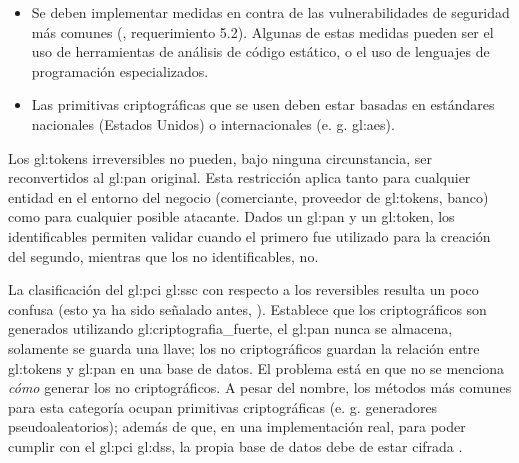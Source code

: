 \begin{itemize}
  \item Se deben implementar medidas en contra de las vulnerabilidades de
    seguridad más comunes (\cite{dss_pa}, requerimiento 5.2). Algunas de estas
    medidas pueden ser el uso de herramientas de análisis de código estático,
    o el uso de lenguajes de programación especializados.

  \item Las primitivas criptográficas que se usen deben estar basadas en
    estándares nacionales (Estados Unidos) o internacionales (e. g.
    \gls{gl:aes}).
\end{itemize}

Los \glspl{gl:token} irreversibles no pueden, bajo ninguna circunstancia, ser
reconvertidos al \gls{gl:pan} original. Esta restricción aplica tanto para
cualquier entidad en el entorno del negocio (comerciante, proveedor de
\glspl{gl:token}, banco) como para cualquier posible atacante. Dados un
\gls{gl:pan} y un \gls{gl:token}, los identificables permiten validar cuando el
primero fue utilizado para la creación del segundo, mientras que los no
identificables, no.



La clasificación del \gls{gl:pci} \gls{gl:ssc} con respecto a los reversibles
resulta un poco confusa (esto ya ha sido señalado antes, \cite{doc_sandra}).
Establece que los criptográficos son generados utilizando
\gls{gl:criptografia_fuerte}, el \gls{gl:pan} nunca se almacena, solamente se
guarda una llave; los no criptográficos guardan la relación entre
\glspl{gl:token} y \gls{gl:pan} en una base de datos. El problema está en que
no se menciona \textit{cómo} generar los no criptográficos. A pesar del nombre,
los métodos más comunes para esta categoría ocupan primitivas criptográficas
(e. g. generadores pseudoaleatorios); además de que, en una implementación
real, para poder cumplir con el \gls{gl:pci} \gls{gl:dss}, la propia base de
datos debe de estar cifrada \cite{pci_dss}.




